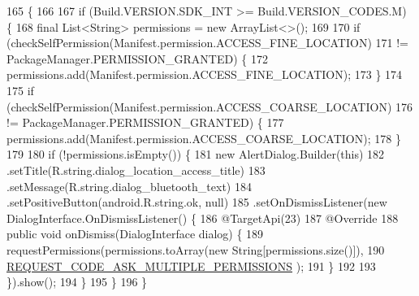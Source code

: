 \begin{DoxyCode}
165                                            \{
166 
167         \textcolor{keywordflow}{if} (Build.VERSION.SDK\_INT >= Build.VERSION\_CODES.M) \{
168             \textcolor{keyword}{final} List<String> permissions = \textcolor{keyword}{new} ArrayList<>();
169 
170             \textcolor{keywordflow}{if} (checkSelfPermission(Manifest.permission.ACCESS\_FINE\_LOCATION)
171                     != PackageManager.PERMISSION\_GRANTED) \{
172                 permissions.add(Manifest.permission.ACCESS\_FINE\_LOCATION);
173             \}
174 
175             \textcolor{keywordflow}{if} (checkSelfPermission(Manifest.permission.ACCESS\_COARSE\_LOCATION)
176                     != PackageManager.PERMISSION\_GRANTED) \{
177                 permissions.add(Manifest.permission.ACCESS\_COARSE\_LOCATION);
178             \}
179 
180             \textcolor{keywordflow}{if} (!permissions.isEmpty()) \{
181                 \textcolor{keyword}{new} AlertDialog.Builder(\textcolor{keyword}{this})
182                         .setTitle(R.string.dialog\_location\_access\_title)
183                         .setMessage(R.string.dialog\_bluetooth\_text)
184                         .setPositiveButton(android.R.string.ok, null)
185                         .setOnDismissListener(\textcolor{keyword}{new} DialogInterface.OnDismissListener() \{
186                             @TargetApi(23)
187                             @Override
188                             \textcolor{keyword}{public} \textcolor{keywordtype}{void} onDismiss(DialogInterface dialog) \{
189                                 requestPermissions(permissions.toArray(\textcolor{keyword}{new} String[permissions.size()]),
190                                         \hyperlink{classit_1_1unibo_1_1torsello_1_1bluetoothpositioning_1_1activities_1_1MainActivity_a319aed5cdd5724e043302babe5fcfeac_a319aed5cdd5724e043302babe5fcfeac}{REQUEST\_CODE\_ASK\_MULTIPLE\_PERMISSIONS}
      );
191                             \}
192 
193                         \}).show();
194             \}
195         \}
196     \}
\end{DoxyCode}
\hypertarget{classit_1_1unibo_1_1torsello_1_1bluetoothpositioning_1_1activities_1_1MainActivity_ab0010b6d3fe518fabfea843626d7b5f1_ab0010b6d3fe518fabfea843626d7b5f1}{}\label{classit_1_1unibo_1_1torsello_1_1bluetoothpositioning_1_1activities_1_1MainActivity_ab0010b6d3fe518fabfea843626d7b5f1_ab0010b6d3fe518fabfea843626d7b5f1} 

